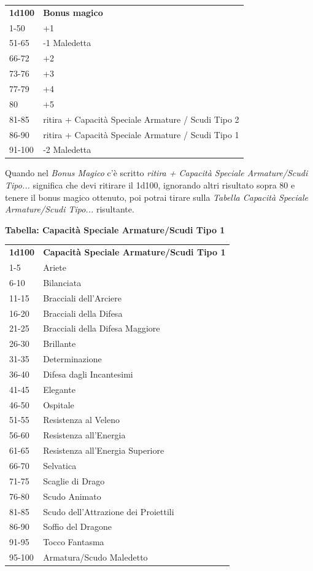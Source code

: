 \begin{multicols}{2}
	\begin{tabularx}{0.45\textwidth}{lX}
		\textbf{1d100} & \textbf{Bonus magico}\\
		1-50 &  +1\\
		51-65 & -1 Maledetta\\
		66-72 & +2\\
		73-76 & +3\\
		77-79 & +4\\
		80 &    +5\\
		81-85 & ritira + Capacità Speciale Armature / Scudi Tipo 2\\
		86-90 & ritira + Capacità Speciale Armature / Scudi Tipo 1\\
		91-100 &-2 Maledetta\\
	\end{tabularx}

	\medskip

	Quando nel \textit{Bonus Magico} c'è scritto \textit{ritira + Capacità Speciale Armature/Scudi Tipo...} significa che devi ritirare il 1d100, ignorando altri risultato sopra 80 e tenere il bonus magico ottenuto, poi potrai tirare sulla \textit{Tabella Capacità Speciale Armature/Scudi Tipo...} risultante.

	\textbf{Tabella: Capacità Speciale Armature/Scudi Tipo 1}

	\begin{tabularx}{0.45\textwidth}{lX}
		\textbf{1d100} & \textbf{Capacità Speciale Armature/Scudi Tipo 1}\\
		1-5 & Ariete\\
		6-10 &Bilanciata\\
		11-15& Bracciali dell'Arciere\\
		16-20& Bracciali della Difesa\\
		21-25& Bracciali della Difesa Maggiore\\
		26-30& Brillante\\
		31-35& Determinazione\\
		36-40& Difesa dagli Incantesimi\\
		41-45& Elegante\\
		46-50& Ospitale\\
		51-55& Resistenza al Veleno\\
		56-60& Resistenza all'Energia\\
		61-65& Resistenza all'Energia Superiore\\
		66-70& Selvatica\\
		71-75& Scaglie di Drago\\
		76-80& Scudo Animato\\
		81-85& Scudo dell'Attrazione dei Proiettili\\
		86-90& Soffio del Dragone\\
		91-95& Tocco Fantasma\\
		95-100 & Armatura/Scudo Maledetto\\
	\end{tabularx}


\end{multicols}

